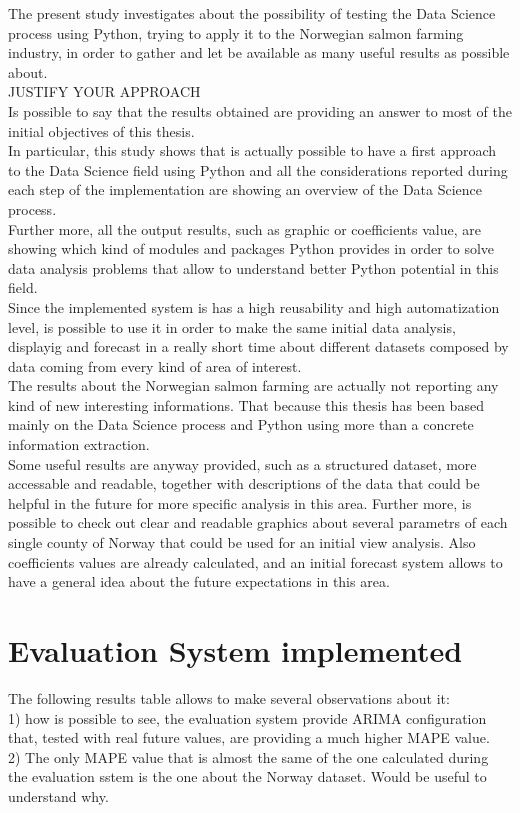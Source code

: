 
The present study investigates about the possibility of testing the Data Science process using Python, trying to apply it to the Norwegian salmon farming industry, in order to gather and let be available as many useful results as possible about.\\
JUSTIFY YOUR APPROACH\\
Is possible to say that the results obtained are providing an answer to most of the initial objectives of this thesis. \\
In particular, this study shows that is actually possible to have a first approach to the Data Science field using Python and all the considerations reported during each step of the implementation are showing an overview of the Data Science process.\\
Further more, all the output results, such as graphic or coefficients value, are showing which kind of modules and packages Python provides in order to solve data analysis problems that allow to understand better Python potential in this field.\\
Since the implemented system is has a high reusability and high automatization level, is possible to use it in order to make the same initial data analysis, displayig and forecast in a really short time about different datasets composed by data coming from every kind of area of interest.\\
The results about the Norwegian salmon farming are actually not reporting any kind of new interesting informations. That because this thesis has been based mainly on the Data Science process and Python using more than a concrete information extraction.\\
Some useful results are anyway provided, such as a structured dataset, more accessable and readable, together with descriptions of the data that could be helpful in the future for more specific analysis in this area. Further more, is possible to check out clear and readable graphics about several parametrs of each single county of Norway that could be used for an initial view analysis. Also coefficients values are already calculated, and an initial forecast system allows to have a general idea about the future expectations in this area.


\newpage

\section{Evaluation System implemented}
The following results table allows to make several observations about it: \\
1) how is possible to see, the evaluation system provide ARIMA configuration that, tested with real future values, are providing a much higher MAPE value. \\
2) The only MAPE value that is almost the same of the one calculated during the evaluation sstem is the one about the Norway dataset. Would be useful to understand why.

